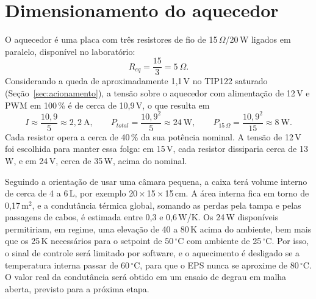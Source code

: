 
\section{Dimensionamento do aquecedor}

O aquecedor é uma placa com três resistores de fio de 15\,$\Omega$/20\,W ligados em paralelo, disponível no laboratório:
\begin{equation}
  R_{eq} = \frac{15}{3} = 5\ \Omega.
\end{equation}
Considerando a queda de aproximadamente 1,1\,V no TIP122 saturado (Seção~\ref{sec:acionamento}), a tensão sobre o aquecedor com alimentação de 12\,V e PWM em 100\,\% é de cerca de 10,9\,V, o que resulta em
\begin{equation}
  I \approx \frac{10{,}9}{5} \approx 2{,}2\ \text{A}, \qquad
  P_{total} = \frac{10{,}9^2}{5} \approx 24\ \text{W}, \qquad
  P_{15\,\Omega} = \frac{10{,}9^2}{15} \approx 8\ \text{W}.
\end{equation}
Cada resistor opera a cerca de 40\,\% da sua potência nominal. A tensão de 12\,V foi escolhida para manter essa folga: em 15\,V, cada resistor dissiparia cerca de 13\,W, e em 24\,V, cerca de 35\,W, acima do nominal.

Seguindo a orientação de usar uma câmara pequena, a caixa terá volume interno de cerca de 4 a 6\,L, por exemplo 20\,$\times$\,15\,$\times$\,15\,cm. A área interna fica em torno de 0,17\,m$^2$, e a condutância térmica global, somando as perdas pela tampa e pelas passagens de cabos, é estimada entre 0,3 e 0,6\,W/K. Os 24\,W disponíveis permitiriam, em regime, uma elevação de 40 a 80\,K acima do ambiente, bem mais que os 25\,K necessários para o setpoint de 50\,\ensuremath{^\circ}C com ambiente de 25\,\ensuremath{^\circ}C. Por isso, o sinal de controle será limitado por software, e o aquecimento é desligado se a temperatura interna passar de 60\,\ensuremath{^\circ}C, para que o EPS nunca se aproxime de 80\,\ensuremath{^\circ}C. O valor real da condutância será obtido em um ensaio de degrau em malha aberta, previsto para a próxima etapa.
